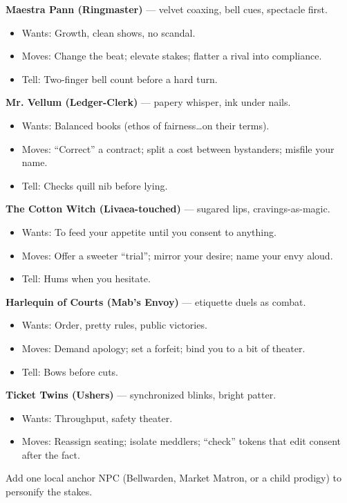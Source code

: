 \documentclass[11pt]{article}
\begin{document}
\textbf{Maestra Pann (Ringmaster)} --- velvet coaxing, bell cues, spectacle first.
\begin{itemize}
\item Wants: Growth, clean shows, no scandal.
\item Moves: Change the beat; elevate stakes; flatter a rival into compliance.
\item Tell: Two-finger bell count before a hard turn.
\end{itemize}

\textbf{Mr. Vellum (Ledger-Clerk)} --- papery whisper, ink under nails.
\begin{itemize}
\item Wants: Balanced books (ethos of fairness\dots on their terms).
\item Moves: ``Correct'' a contract; split a cost between bystanders; misfile your name.
\item Tell: Checks quill nib before lying.
\end{itemize}

\textbf{The Cotton Witch (Livaea-touched)} --- sugared lips, cravings-as-magic.
\begin{itemize}
\item Wants: To feed your appetite until you consent to anything.
\item Moves: Offer a sweeter ``trial''; mirror your desire; name your envy aloud.
\item Tell: Hums when you hesitate.
\end{itemize}

\textbf{Harlequin of Courts (Mab's Envoy)} --- etiquette duels as combat.
\begin{itemize}
\item Wants: Order, pretty rules, public victories.
\item Moves: Demand apology; set a forfeit; bind you to a bit of theater.
\item Tell: Bows before cuts.
\end{itemize}

\textbf{Ticket Twins (Ushers)} --- synchronized blinks, bright patter.
\begin{itemize}
\item Wants: Throughput, safety theater.
\item Moves: Reassign seating; isolate meddlers; ``check'' tokens that edit consent after the fact.
\end{itemize}

Add one local anchor NPC (Bellwarden, Market Matron, or a child prodigy) to personify the stakes.
\end{document}
